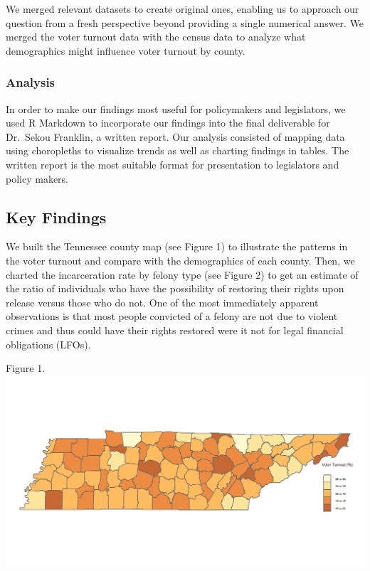 \documentclass[12pt,]{tufte-handout}
\begin{document}
We merged relevant datasets to create original ones, enabling us to
approach our question from a fresh perspective beyond providing a single
numerical answer. We merged the voter turnout data with the census data
to analyze what demographics might influence voter turnout by county.

\subsubsection{Analysis}\label{analysis}

In order to make our findings most useful for policymakers and
legislators, we used R Markdown to incorporate our findings into the
final deliverable for Dr.~Sekou Franklin, a written report. Our analysis
consisted of mapping data using choropleths to visualize trends as well
as charting findings in tables. The written report is the most suitable
format for presentation to legislators and policy makers.

\subsection{Key Findings}\label{key-findings}

We built the Tennessee county map (see Figure 1) to illustrate the
patterns in the voter turnout and compare with the demographics of each
county. Then, we charted the incarceration rate by felony type (see
Figure 2) to get an estimate of the ratio of individuals who have the
possibility of restoring their rights upon release versus those who do
not. One of the most immediately apparent observations is that most
people convicted of a felony are not due to violent crimes and thus
could have their rights restored were it not for legal financial
obligations (LFOs).

Figure 1. \includegraphics{Rplot05.jpeg}
\end{document}
